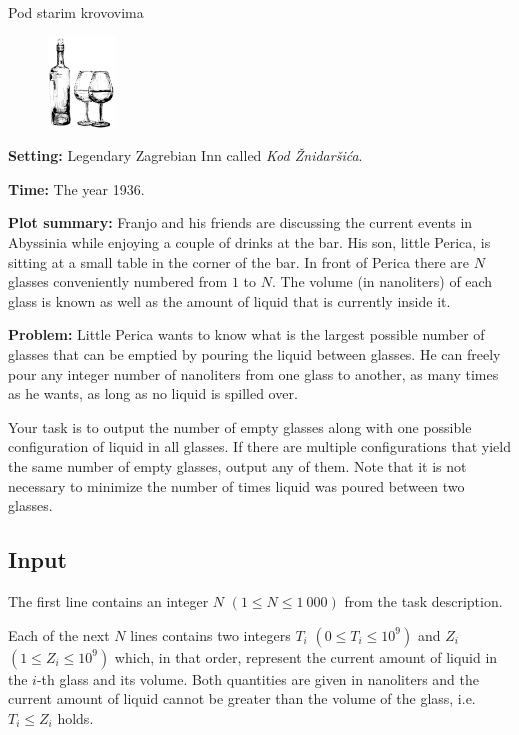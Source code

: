 \begin{statement}[
  problempoints=50,
  timelimit=1 second,
  memorylimit=512 MiB,
]{Pod starim krovovima}

\setlength\intextsep{-0.1cm}
\begin{figure}
\centering
\includegraphics[width=0.16\textwidth]{img/psk.png}
\end{figure}

\textbf{Setting:} Legendary Zagrebian Inn called \textit{Kod Žnidaršića}.

\textbf{Time:} The year 1936.

\textbf{Plot summary:} Franjo and his friends are discussing the current events
in Abyssinia while enjoying a couple of drinks at the bar. His son, little
Perica, is sitting at a small table in the corner of the bar. In front of
Perica there are $N$ glasses conveniently numbered from $1$ to $N$. The volume
(in nanoliters) of each glass is known as well as the amount of liquid that
is currently inside it.

\textbf{Problem:} Little Perica wants to know what is the largest possible
number of glasses that can be emptied by pouring the liquid between glasses.
He can freely pour any integer number of nanoliters from one glass to another,
as many times as he wants, as long as no liquid is spilled over.

Your task is to output the number of empty glasses along with one possible
configuration of liquid in all glasses. If there are multiple configurations
that yield the same number of empty glasses, output any of them. Note that it
is not necessary to minimize the number of times liquid was poured between two
glasses.

\subsection*{Input}
The first line contains an integer $N$ $(1 \le N \le 1\ 000)$ from the task
description.

Each of the next $N$ lines contains two integers $T_i$ $(0 \le T_i \le 10^9)$
and $Z_i$ $(1 \le Z_i \le 10^9)$ which, in that order, represent the current
amount of liquid in the $i$-th glass and its volume. Both quantities are
given in nanoliters and the current amount of liquid cannot be greater than
the volume of the glass, i.e.  $T_i \le Z_i$ holds.


\end{statement}
